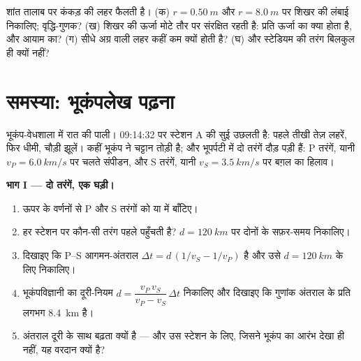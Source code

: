 \begin{exercise}[$\star\star\star$]\label{exo:g12:mechanical-waves:15}
शांत तालाब पर कंकड़ की लहर फैलती है। (क) $r = \qty{0.50}{m}$ और $r = \qty{8.0}{m}$ पर शिखर की लंबाई
निकालिए; वृद्धि-गुणक? (ख) शिखर की ऊर्जा मोटे तौर पर संरक्षित रहती
है: प्रति  ऊर्जा का क्या होता है, और आयाम का?
(ग) सीधे अग्र वाली लहर कहीं कम क्यों  होती है? (घ) और स्टेडियम की
तरंग बिलकुल ही क्यों नहीं?
\end{exercise}

\section{समस्या: भूकंपलेख पढ़ना}

\begin{problem}
\label{pb:g12:mechanical-waves:1}
भूकंप-वेधशाला में रात की पाली। 09:14:32 पर स्टेशन A की सुई उछलती है: पहले
तीखी तेज़ लहरें, फिर धीमी, चौड़ी झूलें। कहीं भूकंप ने चट्टान तोड़ी है; और भूपर्पटी
में दो तरंगें दौड़ पड़ी हैं: P तरंगें, यानी $v_P = \qty{6.0}{km/s}$ पर चलते
संपीडन, और S तरंगें, यानी $v_S = \qty{3.5}{km/s}$ पर बग़ल का हिलाव।

\medskip
\noindent\textbf{भाग I --- दो तरंगें, एक घड़ी।}
\begin{enumerate}
  \item ऊपर के वर्णनों से P और S तरंगों को  या
         में बाँटिए।
  \item हर स्टेशन पर कौन-सी तरंग पहले पहुँचती है? $d = \qty{120}{km}$ पर दोनों
        के सफ़र-समय निकालिए।
  \item दिखाइए कि P--S आगमन-अंतराल $\Delta t = d\,(1/v_S - 1/v_P)$ है और उसे $d = \qty{120}{km}$ के लिए निकालिए।
  \item भूकंपविज्ञानी का दूरी-नियम $d = \dfrac{v_P\,v_S}{v_P - v_S}\,\Delta t$ निकालिए और दिखाइए कि गुणांक
        अंतराल के प्रति  लगभग \qty{8.4}{km} है।
  \item अंतराल दूरी के साथ बढ़ता क्यों है --- और उस स्टेशन के लिए, जिसने
        भूकंप का आरंभ देखा ही नहीं, यह वरदान क्यों है?
\end{enumerate}


\end{problem}
